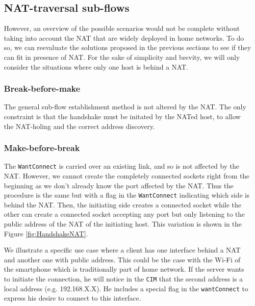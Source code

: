 \subsection{NAT-traversal sub-flows}

However, an overview of the possible scenarios would not be complete without taking into account the NAT that are widely deployed in home networks. To do so, we can reevaluate the solutions proposed in the previous sections to see if they can fit in presence of NAT. For the sake of simplicity and brevity, we will only consider the situations where only one host is behind a NAT.

\subsubsection{Break-before-make}
The general sub-flow establishment method is not altered by the NAT. The only constraint is that the handshake must be initated by the NATed host, to allow the NAT-holing and the correct address discovery.

\subsubsection{Make-before-break}


The \texttt{WantConnect} is carried over an existing link, and so is not affected by the NAT. However, we cannot create the completely connected sockets right from the beginning as we don't already know the port affected by the NAT. Thus the procedure is the same but with a flag in the \texttt{WantConnect} indicating which side is behind the NAT. Then, the initiating side creates a connected socket while the other can create a connected socket accepting any port but only listening to the public address of the NAT of the initiating host. This variation is shown in the Figure \ref{fig:HandshakeNAT}. 

We illustrate a specific use case where a client has one interface behind a NAT and another one with public address. This could be the case with the Wi-Fi of the smartphone which is traditionally part of home network. If the server wants to initiate the connection, he will notice in the \texttt{CIM} that the second address is a local address (e.g. 192.168.X.X). He includes a special flag in the \texttt{wantConnect} to express his desire to connect to this interface. 

